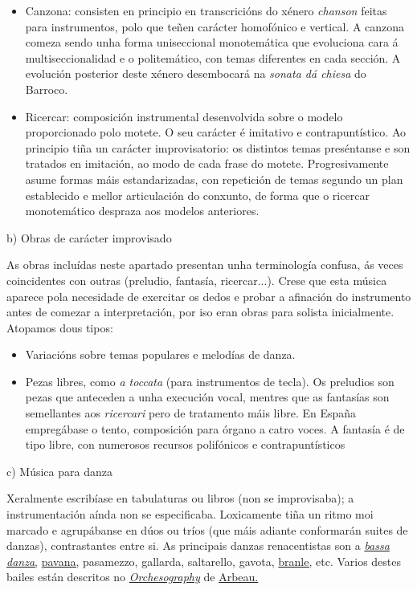 \documentclass[
]{article}
\begin{document}
\begin{itemize}
\item
  Canzona: consisten en principio en transcricións do xénero
  \emph{chanson} feitas para instrumentos, polo que teñen carácter
  homofónico e vertical. A canzona comeza sendo unha forma uniseccional
  monotemática que evoluciona cara á multiseccionalidad e o
  politemático, con temas diferentes en cada sección. A evolución
  posterior deste xénero desembocará na \emph{sonata dá chiesa} do
  Barroco.
\item
  Ricercar: composición instrumental desenvolvida sobre o modelo
  proporcionado polo motete. O seu carácter é imitativo e
  contrapuntístico. Ao principio tiña un carácter improvisatorio: os
  distintos temas preséntanse e son tratados en imitación, ao modo de
  cada frase do motete. Progresivamente asume formas máis
  estandarizadas, con repetición de temas segundo un plan establecido e
  mellor articulación do conxunto, de forma que o ricercar monotemático
  despraza aos modelos anteriores.
\end{itemize}

b) Obras de carácter improvisado

As obras incluídas neste apartado presentan unha terminología confusa,
ás veces coincidentes con outras (preludio, fantasía, ricercar...).
Crese que esta música aparece pola necesidade de exercitar os dedos e
probar a afinación do instrumento antes de comezar a interpretación, por
iso eran obras para solista inicialmente. Atopamos dous tipos:

\begin{itemize}
\item
  Variacións sobre temas populares e melodías de danza.
\item
  Pezas libres, como \emph{a toccata} (para instrumentos de tecla). Os
  preludios son pezas que anteceden a unha execución vocal, mentres que
  as fantasías son semellantes aos \emph{ricercari} pero de tratamento
  máis libre. En España empregábase o tento, composición para órgano a
  catro voces. A fantasía é de tipo libre, con numerosos recursos
  polifónicos e contrapuntísticos
\end{itemize}

c) Música para danza

Xeralmente escribíase en tabulaturas ou libros (non se improvisaba); a
instrumentación aínda non se especificaba. Loxicamente tiña un ritmo moi
marcado e agrupábanse en dúos ou tríos (que máis adiante conformarán
suites de danzas), contrastantes entre si. As principais danzas
renacentistas son a
\href{http://es.wikipedia.org/wiki/Baja_danza}{\emph{bassa danza},}
\href{http://es.wikipedia.org/wiki/Pavana}{pavana,} pasamezzo, gallarda,
saltarello, gavota, \href{http://es.wikipedia.org/wiki/Branle}{branle,}
etc. Varios destes bailes están descritos no
\href{http://memory.loc.gov/cgi-bin/ampage?collId=musdi\&fileName=219//musdi219.db\&recNum=3\&itemLink=r?ammem/musdibib:@field\%28NUMBER+@od1\%28musdi+219\%29\%29\&linkText=0}{\emph{Orchesography}}
de \href{http://es.wikipedia.org/wiki/Thoinot_Arbeau}{Arbeau.}
\end{document}

